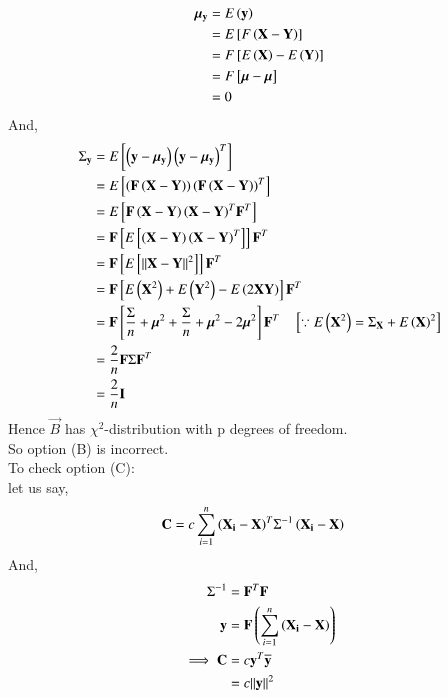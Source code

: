 \documentclass[journal,12pt,onecolumn]{IEEEtran}
\theoremstyle{remark}
\begin{document}
\begin{align}
{\bm{\mu}}_{\mathbf{y}} &= E\left(\mathbf{y}\right) \\
                     &= E{}\left[F\left(\mathbf{X}-\mathbf{Y}\right)\right] \\
                     &= F{}\left[E\left(\mathbf{X}\right)-E\left(\mathbf{Y}\right)\right] \\
                     &= F{}\left[\bm{\mu}-\bm{\mu}\right] \\
                     &= 0
\end{align}
And,
\begin{align}
{\Sigma}_{\mathbf{y}} &= E{}\left[\left(\mathbf{y}-{\bm{\mu}}_{\mathbf{y}}\right){\left(\mathbf{y}-{\bm{\mu}}_{\mathbf{y}}\right)}^T\right] \\
                   &= E{}\left[\left(\mathbf{F}\left(\mathbf{X}-\mathbf{Y}\right)\right){\left(\mathbf{F}\left(\mathbf{X}-\mathbf{Y}\right)\right)}^T\right] \\
                   &= E{}\left[\mathbf{F}\left(\mathbf{X}-\mathbf{Y}\right){\left(\mathbf{X}-\mathbf{Y}\right)}^T{\mathbf{F}}^T\right] \\
                   &= \mathbf{F}{}\left[E{}\left[\left(\mathbf{X}-\mathbf{Y}\right){\left(\mathbf{X}-\mathbf{Y}\right)}^T\right]\right]{\mathbf{F}}^T \\
                   &= \mathbf{F}{}\left[E{}\left[{\left\lVert\mathbf{X}-\mathbf{Y}\right\rVert}^2\right]\right]{\mathbf{F}}^T \\
                   &= \mathbf{F}{}\left[E\left({\mathbf{X}}^2\right)+E\left({\mathbf{Y}}^2\right)-E\left(2\mathbf{X}\mathbf{Y}\right)\right]{\mathbf{F}}^T  \\
                   &= \mathbf{F}{}\left[\frac{\Sigma}{n}+{\bm{\mu}}^2+\frac{\Sigma}{n}+{\bm{\mu}}^2-2{\bm{\mu}}^2\right]{\mathbf{F}}^T  \quad {}\left[\because E\left({\mathbf{X}}^2\right)={\Sigma}_{\mathbf{X}}+{E\left(\mathbf{X}\right)}^2\right]\\
                   &= \frac{2}{n}\mathbf{F}\Sigma{\mathbf{F}}^T \\
                   &= \frac{2}{n}\mathbf{I}                 
\end{align}
Hence $\vec{B}$ has ${\chi}^2$-distribution with p degrees of freedom. \\
So option (B) is incorrect. \\
To check option (C): \\
let us say,
\begin{align}
\mathbf{C} &= c\sum_{i=1}^n{\left(\mathbf{X_i}-\mathbf{X}\right)}^T{\Sigma}^{-1}\left(\mathbf{X_i}-\mathbf{X}\right)
\end{align}
And,
\begin{align}
{\Sigma}^{-1} &= {\mathbf{F}}^T\mathbf{F}  \\
\mathbf{y} &= \mathbf{F}\left(\sum_{i=1}^{n}\left(\mathbf{X_i}-\mathbf{X}\right)\right) \\
\implies \mathbf{C} &= c{\mathbf{y}}^T\overline{\mathbf{y}} \\
                 &= c{\left\lVert\mathbf{y}\right\rVert}^2  \label{eq:23/25/6}
\end{align}
\end{document}
